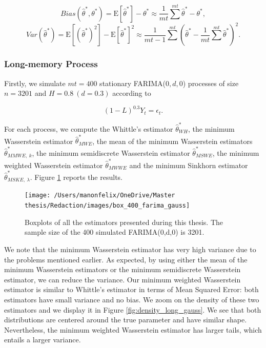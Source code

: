 \documentclass[
  11pt,
]{article}
\begin{document}
\[Bias(\hat \theta^*, \theta^*) = \mathrm{E}[\hat \theta^*] - \theta^* \approx  \frac{1}{mt} \sum^{mt} \hat \theta^* - \theta^*,\]
\[Var( \hat \theta^*) = \mathrm{E}[(\hat \theta^*)^2]-\mathrm{E}[\hat \theta^*]^{2} \approx \frac{1}{mt - 1} \sum^{mt}(\hat \theta^* - \frac{1}{mt} \sum^{mt} \hat \theta^* )^2.\]

\pagebreak

\hypertarget{long-memory-process}{%
\subsubsection{Long-memory Process}\label{long-memory-process}}

Firstly, we simulate \(mt = 400\) stationary FARIMA(\(0,d,0\)) processes
of size \(n = 3201\) and \(H = 0.8 \ (d = 0.3)\) according to

\[(1-L)^{0.3}Y_t = \epsilon_t.\]

For each process, we compute the Whittle's estimator
\(\hat \theta^*_{WH}\), the minimum Wasserstein estimator
\(\hat \theta^*_{MWE}\), the mean of the minimum Wasserstein estimators
\(\hat \theta^*_{MMWE, \ k}\), the minimum semidiscrete Wasserstein
estimator \(\hat \theta^*_{MSWE}\), the minimum weighted Wasserstein
estimator \(\hat \theta^*_{MWWE}\) and the minimum Sinkhorn estimator
\(\hat \theta^*_{MSKE,\ \lambda}\). Figure \ref{fig:box_farima_400}
reports the results.

\begin{figure}

{\centering \texttt{[image: /Users/manonfelix/OneDrive/Master thesis/Redaction/images/box\_400\_farima\_gauss]} 

}

\caption{Boxplots of all the estimators presented during this thesis. The sample size of the 400 simulated FARIMA(0,d,0) is 3201.}\label{fig:box_farima_400}
\end{figure}

We note that the minimum Wasserstein estimator has very high variance
due to the problems mentioned earlier. As expected, by using either the
mean of the minimum Wasserstein estimators or the minimum semidiscrete
Wasserstein estimator, we can reduce the variance. Our minimum weighted
Wasserstein estimator is similar to Whittle's estimator in terms of Mean
Squared Error: both estimators have small variance and no bias. We zoom
on the density of these two estimators and we display it in Figure
\ref{fig:density_long_gauss}. We see that both distributions are
centered around the true parameter and have similar shape. Nevertheless,
the minimum weighted Wasserstein estimator has larger tails, which
entails a larger variance.
\end{document}
